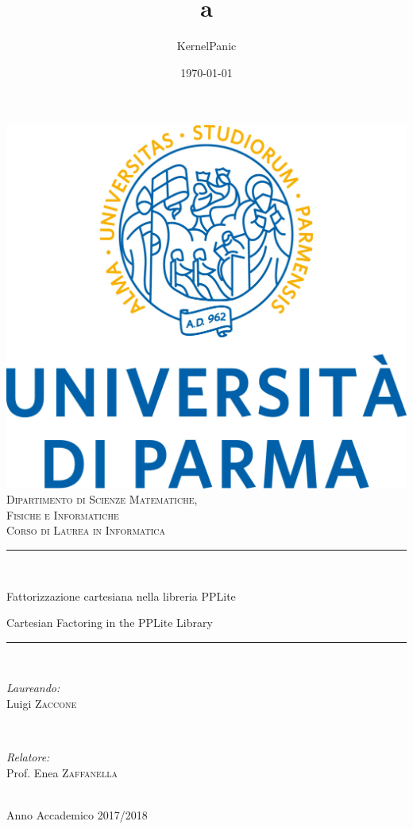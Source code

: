 \documentclass[italian]{mimosis}
\author{KernelPanic}
\date{\today}
\title{a}
\theoremstyle{definition}
\begin{document}
\begin{titlepage}

	\newcommand{\HRule}{\rule{\linewidth}{0.5mm}}

	\center

	\includegraphics[width=0.55\linewidth]{images/logoUnipr.jpg}\\[1cm]

	\textsc{\Large Dipartimento di Scienze Matematiche,\\ Fisiche e Informatiche}\\[0.5cm]
	\textsc{\large Corso di Laurea in Informatica}\\[0.5cm]

	\HRule \\[0.2cm]
	{\large \bfseries \begin{center}
	    Fattorizzazione cartesiana nella libreria PPLite
	\end{center}}
	{\large \bfseries \begin{center}
            Cartesian Factoring in the PPLite Library
        \end{center}}
	\HRule \\[1.5cm]

	\begin{minipage}{0.4\textwidth}
		\begin{flushleft} \large
			\emph{Laureando:}\\
			Luigi \textsc{Zaccone}
		\end{flushleft}
	\end{minipage}
	~
	\begin{minipage}{0.5\textwidth}
		\begin{flushright} \large
			\emph{Relatore:} \\
			Prof. Enea \textsc{Zaffanella}
		\end{flushright}
	\end{minipage}\\[2.5cm]

	{\large Anno Accademico 2017/2018}

	\vfill

\end{titlepage}
\tableofcontents
\end{document}
